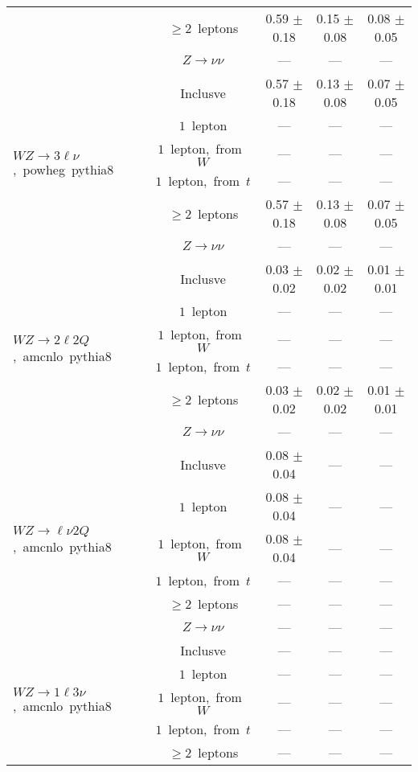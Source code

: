 \documentclass{article}
\begin{document}
\begin{longtable}{|l|c|c|c|c|}
 & $\ge2$~leptons  & 0.59 $\pm$ 0.18  & 0.15 $\pm$ 0.08  & 0.08 $\pm$ 0.05 \\* 
 & $Z\rightarrow\nu\nu$  & ---  & ---  & --- \\* 
\hline 
\multirow{6}{*}{$WZ{\rightarrow}3\ell\nu$,~powheg~pythia8} & Inclusve  & 0.57 $\pm$ 0.18  & 0.13 $\pm$ 0.08  & 0.07 $\pm$ 0.05 \\* 
 & $1$~lepton  & ---  & ---  & --- \\* 
 & $1$~lepton,~from~$W$  & ---  & ---  & --- \\* 
 & $1$~lepton,~from~$t$  & ---  & ---  & --- \\* 
 & $\ge2$~leptons  & 0.57 $\pm$ 0.18  & 0.13 $\pm$ 0.08  & 0.07 $\pm$ 0.05 \\* 
 & $Z\rightarrow\nu\nu$  & ---  & ---  & --- \\* 
\hline 
\multirow{6}{*}{$WZ{\rightarrow}2{\ell}2Q$,~amcnlo~pythia8} & Inclusve  & 0.03 $\pm$ 0.02  & 0.02 $\pm$ 0.02  & 0.01 $\pm$ 0.01 \\* 
 & $1$~lepton  & ---  & ---  & --- \\* 
 & $1$~lepton,~from~$W$  & ---  & ---  & --- \\* 
 & $1$~lepton,~from~$t$  & ---  & ---  & --- \\* 
 & $\ge2$~leptons  & 0.03 $\pm$ 0.02  & 0.02 $\pm$ 0.02  & 0.01 $\pm$ 0.01 \\* 
 & $Z\rightarrow\nu\nu$  & ---  & ---  & --- \\* 
\hline 
\multirow{6}{*}{$WZ{\rightarrow}{\ell}{\nu}2Q$,~amcnlo~pythia8} & Inclusve  & 0.08 $\pm$ 0.04  & ---  & --- \\* 
 & $1$~lepton  & 0.08 $\pm$ 0.04  & ---  & --- \\* 
 & $1$~lepton,~from~$W$  & 0.08 $\pm$ 0.04  & ---  & --- \\* 
 & $1$~lepton,~from~$t$  & ---  & ---  & --- \\* 
 & $\ge2$~leptons  & ---  & ---  & --- \\* 
 & $Z\rightarrow\nu\nu$  & ---  & ---  & --- \\* 
\hline 
\multirow{6}{*}{$WZ{\rightarrow}1{\ell}3{\nu}$,~amcnlo~pythia8} & Inclusve  & ---  & ---  & --- \\* 
 & $1$~lepton  & ---  & ---  & --- \\* 
 & $1$~lepton,~from~$W$  & ---  & ---  & --- \\* 
 & $1$~lepton,~from~$t$  & ---  & ---  & --- \\* 
 & $\ge2$~leptons  & ---  & ---  & --- \\* 

\end{longtable}
\end{document}
